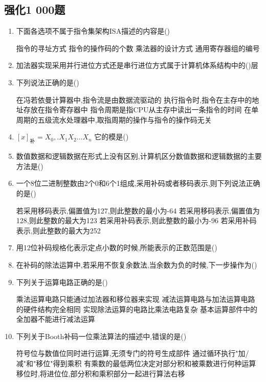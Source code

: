 \documentclass[12pt, a4paper, oneside, UTF8]{ctexbook}
\begin{document}
\subsection{强化1 000题}
\begin{enumerate}
    \item 下面各选项不属于指令集架构ISA描述的内容是(\qquad)
    \begin{choices}[2]
        \task 指令的寻址方式
        \task 指令的操作码的个数
        \task 乘法器的设计方式
        \task 通用寄存器组的编号
    \end{choices} 

    \item 加法器实现采用并行进位方式还是串行进位方式属于计算机体系结构中的(\qquad)层
    \item 下列说法正确的是(\qquad)
    \begin{choices}[1]
        \task 在冯若依曼计算器中,指令流是由数据流驱动的
        \task 执行指令时,指令在主存中的地址存放在指令寄存器中
        \task 指令周期是指CPU从主存中读出一条指令的时间
        \task 在单周期的五级流水处理器中,取指周期的操作与指令的操作码无关
    \end{choices}

    \item $[x]_{\text{补}}=X_0,.X_1X_2\ldots X_n$ 它的模是(\qquad)
    \item 数值数据和逻辑数据在形式上没有区别,计算机区分数值数据和逻辑数据的主要方法是(\qquad)
    \item 一个8位二进制整数由2个0和6个1组成,采用补码或者移码表示,则下列说法正确的是(\qquad)
    \begin{choices}[1]
        \task 若采用移码表示,偏置值为127,则此整数的最小为-64
        \task 若采用移码表示,偏置值为128,则此整数的最大为123
        \task 若采用补码表示,则此整数的最小为-96
        \task 若采用补码表示,则此整数的最大为252
    \end{choices}

    \item 用12位补码规格化表示定点小数的时候,所能表示的正数范围是(\qquad)
    \item 在补码的除法运算中,若采用不恢复余数法,当余数为负的时候,下一步操作为(\qquad)
    \item 下列关于运算电路正确的是(\qquad)
    \begin{choices}[1]
        \task 乘法运算电路只能通过加法器和移位器来实现
        \task 减法运算电路与加法运算电路的硬件结构完全相同
        \task 实现除法运算的电路比乘法电路复杂
        \task 基本运算部件中的全加器不能进行减法运算
    \end{choices}
    \item 下列关于Booth补码一位乘法算法的描述中,错误的是(\qquad)
    \begin{choices}[1]
        \task 符号位与数值位同时进行运算,无须专门的符号生成部件
        \task 通过循环执行"加/减"和"移位"得到乘积
        \task 有乘数的最低两位决定对部分积和被乘数进行何种运算
        \task 移位时,将进位位,部分积和乘积部分一起进行算法右移
    \end{choices}


\end{enumerate}
\end{document}
